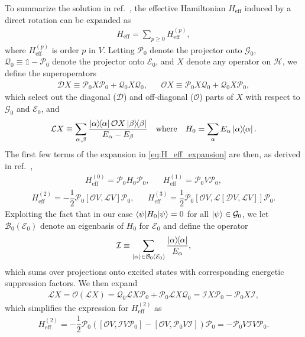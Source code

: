 \documentclass[preprint,showkeys,nofootinbib]{revtex4-1}
\renewcommand{\t}{\text} %
\newcommand{\f}{\dfrac} %
\newcommand{\p}[1]{\left(#1\right)} %
\renewcommand{\sp}[1]{\left[#1\right]} %
\newcommand{\bk}{\braket} %
\newcommand{\B}{\mathcal{B}}
\newcommand{\D}{\mathcal{D}}
\newcommand{\E}{\mathcal{E}}
\newcommand{\G}{\mathcal{G}}
\renewcommand{\H}{\mathcal{H}}
\newcommand{\I}{\mathcal{I}}
\renewcommand{\L}{\mathcal{L}}
\renewcommand{\O}{\mathcal{O}}
\renewcommand{\P}{\mathcal{P}}
\newcommand{\Q}{\mathcal{Q}}
\newcommand{\1}{\mathds{1}}
\begin{document}
To summarize the solution in ref.~\cite{bravyi2011schrieffer}, the
effective Hamiltonian $H_{\t{eff}}$ induced by a direct rotation can
be expanded as
\begin{align}
  H_{\t{eff}} = \sum_{p\ge0} H_{\t{eff}}^{(p)},
  \label{eq:H_eff_expansion}
\end{align}
where $H_{\t{eff}}^{(p)}$ is order $p$ in $V$.  Letting $\P_0$ denote
the projector onto $\G_0$, $\Q_0\equiv\1-\P_0$ denote the projector
onto $\E_0$, and $X$ denote any operator on $\H$, we define the
superoperators
\begin{align}
  \D X \equiv \P_0 X \P_0 + \Q_0 X \Q_0,
  &&
  \O X \equiv \P_0 X \Q_0 + \Q_0 X \P_0,
\end{align}
which select out the diagonal ($\D$) and off-diagonal ($\O$) parts of
$X$ with respect to $\G_0$ and $\E_0$, and
\begin{align}
  \L X \equiv \sum_{\alpha,\beta}
  \f{\op\alpha \O X \op\beta}{E_\alpha - E_\beta}
  &&
  \t{where}
  &&
  H_0 = \sum_\alpha E_\alpha \op\alpha.
\end{align}
The first few terms of the expansion in \eqref{eq:H_eff_expansion} are
then, as derived in ref.~\cite{bravyi2011schrieffer},
\begin{align}
  H_{\t{eff}}^{(0)} = \P_0 H_0 \P_0,
  &&
  H_{\t{eff}}^{(1)} = \P_0 V \P_0,
  \label{eq:H_eff_0_1}
\end{align}
\begin{align}
  H_{\t{eff}}^{(2)} = - \f12 \P_0 \sp{\O V,\L V} \P_0,
  &&
  H_{\t{eff}}^{(3)} = \f12 \P_0 \sp{\O V, \L \sp{\D V, \L V}} \P_0.
\end{align}
Exploiting the fact that in our case $\bk{\psi|H_0|\psi}=0$ for all
$\ket\psi\in\G_0$, we let $\B_0\p{\E_0}$ denote an eigenbasis of $H_0$
for $\E_0$ and define the operator
\begin{align}
  \I \equiv \sum_{\ket\alpha\in\B_0\p{\E_0}}\f{\op\alpha}{E_\alpha},
\end{align}
which sums over projections onto excited states with corresponding
energetic suppression factors.  We then expand
\begin{align}
  \L X = \O\p{\L X} = \Q_0 \L X \P_0 + \P_0 \L X \Q_0
  = \I X \P_0 - \P_0 X \I,
\end{align}
which simplifies the expression for $H_{\t{eff}}^{(2)}$ as
\begin{align}
  H_{\t{eff}}^{(2)}
  = - \f12 \P_0 \p{\sp{\O V, \I V \P_0}
    - \sp{\O V, \P_0 V \I}} \P_0
  = - \P_0 V \I V \P_0.
  \label{eq:H_eff_2}
\end{align}
\end{document}

